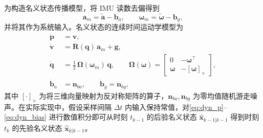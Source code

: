 为构造名义状态传播模型，将 IMU 读数去偏得到
\begin{equation}
    \mathbf{a}_m = \tilde{\mathbf{a}} - \mathbf{b}_a,\qquad
    \boldsymbol\omega_m = \tilde{\boldsymbol\omega} - \mathbf{b}_g,
    \label{eq:imu_debias}
\end{equation}
并将其作为系统输入。名义状态的连续时间运动学模型为
\begin{align}
    \dot{\mathbf{p}} &= \mathbf{v}, 
    \label{eq:dyn_p} \\
    \dot{\mathbf{v}} &= \mathbf{R}(\mathbf{q})\,\mathbf{a}_m + \mathbf{g}, 
    \label{eq:dyn_v} \\
    \dot{\mathbf{q}} &= \tfrac{1}{2}\,\boldsymbol\Omega(\boldsymbol\omega_m)\,\mathbf{q},
    \qquad
    \boldsymbol\Omega(\boldsymbol\omega)
    =
    \begin{bmatrix}
        0 & -\boldsymbol\omega^\top \\
        \boldsymbol\omega & -[\boldsymbol\omega]_\times
    \end{bmatrix}\!,
    \label{eq:dyn_q} \\
    \dot{\mathbf{b}}_a &= \mathbf{n}_{ba},\qquad 
    \dot{\mathbf{b}}_g = \mathbf{n}_{bg},
    \label{eq:dyn_bias}
\end{align}
其中 $[\cdot]_\times$ 为将三维向量映射为反对称矩阵的算子，$\mathbf{n}_{ba},\mathbf{n}_{bg}$ 为零均值随机游走噪声。在实际实现中，假设采样间隔 $\Delta t$ 内输入保持常值，对\eqref{eq:dyn_p}–\eqref{eq:dyn_bias} 进行数值积分即可从时刻 $t_{k-1}$ 的后验名义状态 $\hat{\mathbf{x}}_{k-1|k-1}$ 得到时刻 $t_k$ 的先验名义状态 $\hat{\mathbf{x}}_{k|k-1}$。

